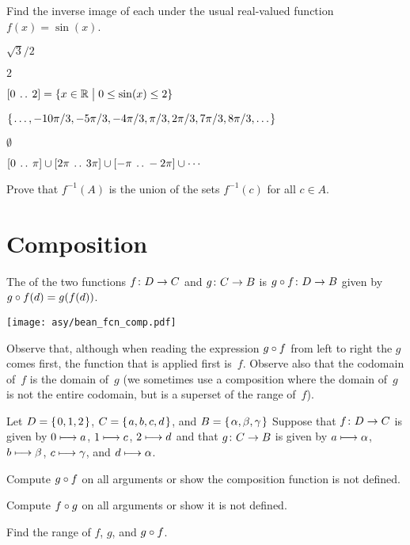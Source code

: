 \documentclass{ibl}
\begin{document}
\begin{ex}
Find the inverse image of each under the usual real-valued function $f(x)=\sin(x)$.
\begin{exes}
\item $\sqrt{3}/2$
\item $2$
\item $[0\:\mathinner{\ldotp\ldotp}\:2]=\{x\in\mathbb{R} \bigm| 0\leq \sin(x)\leq 2\}$
\end{exes}
\begin{ans}
\begin{exes}
\item $\mbox{$\{\hspace{0.1em}\ldots,-10\pi/3,-5\pi/3,-4\pi/3,\pi/3,2\pi/3,7\pi/3,8\pi/3, \ldots\hspace{0.1em}\}$}$
\item $\emptyset$
\item $[0\:\mathinner{\ldotp\ldotp}\:\pi]\cup[2\pi\:\mathinner{\ldotp\ldotp}\:3\pi]\cup[-\pi\:\mathinner{\ldotp\ldotp}\:-2\pi]\cup\cdots$
\end{exes}
\end{ans}
\end{ex}


\begin{ex}
Prove that $f^{-1}(A)$ is the union of the sets $f^{-1}(c)$ for all $c\in A$.
\end{ex}





\section{Composition}

\begin{df}
The  of
the two functions
$\mbox{$f\colon D\to C$}$ and $\mbox{$g\colon C\to B$}$ 
is $\mbox{$g\mathbin{\circ} f\colon D\to B$}$ given by 
$g\mathbin{\circ} f(d)=g(f(d))$.
\end{df}

\begin{center}
  \texttt{[image: asy/bean\_fcn\_comp.pdf]}  
\end{center}
Observe that, 
although when reading the expression $g\mathbin{\circ} f$ from left to right 
the $g$ comes first, 
the function that is applied first is~$f$. 
Observe also that the codomain of~$f$ is the domain of~$g$
(we sometimes use a composition where the domain of~$g$ is not the 
entire codomain, but is a superset of the range of~$f$).

\begin{ex} Let $D=\mbox{$\{\hspace{0.1em}0,1,2\hspace{0.1em}\}$}$, $C=\mbox{$\{\hspace{0.1em}a,b,c,d\hspace{0.1em}\}$}$, 
and $B=\mbox{$\{\hspace{0.1em}\alpha,\beta,\gamma\hspace{0.1em}\}$}$
Suppose that $\mbox{$f\colon D\to C$}$ is given by $0\stackrel{}{\longmapsto} a$, $1\stackrel{}{\longmapsto} c$, 
$2\stackrel{}{\longmapsto} d$ and that $\mbox{$g\colon C\to B$}$
is given by 
$a\stackrel{}{\longmapsto}\alpha$, $b\stackrel{}{\longmapsto} \beta$, $c\stackrel{}{\longmapsto}\gamma$,
and $d\stackrel{}{\longmapsto}\alpha$.
\begin{exes}
\item Compute $g\mathbin{\circ} f$ on all arguments or show the composition
  function is not defined.
\item Compute $f\mathbin{\circ} g$ on all arguments or show it is not defined.
\item Find the range of $f$, $g$, and $g\mathbin{\circ} f$.    
\end{exes}
\end{ex}
\end{document}
